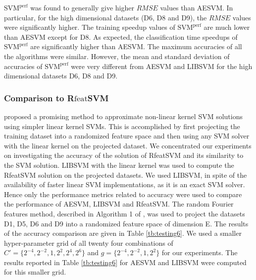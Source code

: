 \documentclass[twoside]{article}
\begin{document}
$\text{SVM}^{\text{perf}}$ was found to generally give higher $RMSE$ values than AESVM. In particular, for the high dimensional datasets (D6, D8 and D9), the $RMSE$ values were significantly higher. The training speedup values of $\text{SVM}^{\text{perf}}$ are much lower than AESVM except for D8. As expected, the classification time speedups of $\text{SVM}^{\text{perf}}$ are significantly higher than AESVM. The maximum accuracies of all the algorithms were similar. However, the mean and standard deviation of accuracies of $\text{SVM}^{\text{perf}}$ were very different from AESVM and LIBSVM for the high dimensional datasets D6, D8 and D9.


\subsubsection{Comparison to R$\mathrm{feat}$SVM} \label{sec:expRfeatSVM}
\citet{rahimi07} proposed a promising method to approximate non-linear kernel SVM solutions using simpler linear kernel SVMs. This is accomplished by first projecting the training dataset into a randomized feature space and then using any SVM solver with the linear kernel on the projected dataset.  We concentrated our experiments on investigating the accuracy of the solution of RfeatSVM and its similarity to the SVM solution. LIBSVM with the linear kernel was used to compute the RfeatSVM solution on the projected datasets. We used LIBSVM, in spite of the availability of faster linear SVM implementations, as it is an exact SVM solver. Hence only the performance metrics related to accuracy were used to compare the performance of AESVM, LIBSVM and RfeatSVM. The random Fourier features method, described in Algorithm 1 of \citet{rahimi07}, was used to project the datasets D1, D5, D6 and D9 into a randomized feature space of dimension E. The results of the accuracy comparison are given in Table \ref{tb:testing6}. We used a smaller hyper-parameter grid of all twenty four combinations of $C' = \{2^{-4},2^{-2},1,2^{2},2^{4},2^6\}$ and $g = \{2^{-4},2^{-2},1,2^2\}$ for our experiments. The results reported in Table \ref{tb:testing6} for AESVM and LIBSVM were computed for this smaller grid.
\end{document}
